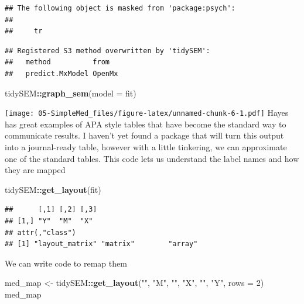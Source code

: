 \documentclass[
  11pt,
]{book}
\newenvironment{Shaded}{\begin{snugshade}}{\end{snugshade}}
\newcommand{\AttributeTok}[1]{\textcolor[rgb]{0.27,0.27,0.27}{#1}}
\newcommand{\DecValTok}[1]{\textcolor[rgb]{0.06,0.06,0.06}{#1}}
\newcommand{\FunctionTok}[1]{\textcolor[rgb]{0.27,0.27,0.27}{\textbf{#1}}}
\newcommand{\NormalTok}[1]{#1}
\newcommand{\OtherTok}[1]{\textcolor[rgb]{0.37,0.37,0.37}{#1}}
\newcommand{\SpecialCharTok}[1]{\textcolor[rgb]{0.43,0.43,0.43}{\textbf{#1}}}
\newcommand{\StringTok}[1]{\textcolor[rgb]{0.5,0.5,0.5}{#1}}
\begin{document}
\begin{verbatim}
## The following object is masked from 'package:psych':
## 
##     tr
\end{verbatim}

\begin{verbatim}
## Registered S3 method overwritten by 'tidySEM':
##   method          from  
##   predict.MxModel OpenMx
\end{verbatim}

\begin{Shaded}
\begin{Highlighting}[]
\NormalTok{tidySEM}\SpecialCharTok{::}\FunctionTok{graph\_sem}\NormalTok{(}\AttributeTok{model =}\NormalTok{ fit)}
\end{Highlighting}
\end{Shaded}

\texttt{[image: 05-SimpleMed\_files/figure-latex/unnamed-chunk-6-1.pdf]} Hayes has great examples of APA style tables that have become the standard way to communicate results. I haven't yet found a package that will turn this output into a journal-ready table, however with a little tinkering, we can approximate one of the standard tables. This code lets us understand the label names and how they are mapped

\begin{Shaded}
\begin{Highlighting}[]
\NormalTok{tidySEM}\SpecialCharTok{::}\FunctionTok{get\_layout}\NormalTok{(fit)}
\end{Highlighting}
\end{Shaded}

\begin{verbatim}
##      [,1] [,2] [,3]
## [1,] "Y"  "M"  "X" 
## attr(,"class")
## [1] "layout_matrix" "matrix"        "array"
\end{verbatim}

We can write code to remap them

\begin{Shaded}
\begin{Highlighting}[]
\NormalTok{med\_map }\OtherTok{\textless{}{-}}\NormalTok{ tidySEM}\SpecialCharTok{::}\FunctionTok{get\_layout}\NormalTok{(}\StringTok{""}\NormalTok{, }\StringTok{"M"}\NormalTok{, }\StringTok{""}\NormalTok{, }\StringTok{"X"}\NormalTok{, }\StringTok{""}\NormalTok{, }\StringTok{"Y"}\NormalTok{, }\AttributeTok{rows =} \DecValTok{2}\NormalTok{)}
\NormalTok{med\_map}
\end{Highlighting}
\end{Shaded}
\end{document}

